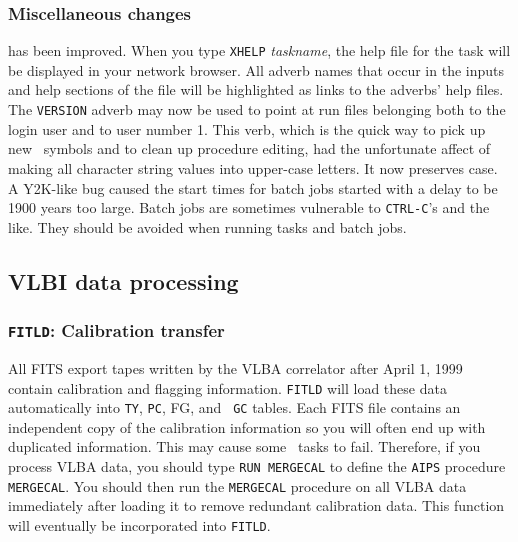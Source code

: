 \subsubsection{Miscellaneous changes}

\begin{description}
 has been improved.  When you type {\tt XHELP} {\it
    taskname}, the help file for the task will be displayed in your
    network browser.  All adverb names that occur in the inputs and
    help sections of the file will be highlighted as links to the
    adverbs' help files.
 The {\tt VERSION} adverb may now be used to point at run
    files belonging both to the login user and to user number 1.
 \hspace{3em} This verb, which is the quick way to
   pick up new \POPS\ symbols and to clean up procedure editing, had
   the unfortunate affect of making all character string values into
   upper-case letters.  It now preserves case.
 A Y2K-like bug caused the start times for batch jobs
    started with a delay to be 1900 years too large.  Batch jobs are
    sometimes vulnerable to {\tt CTRL-C}'s and the like.  They should
   be avoided when running tasks and batch jobs.
\end{description}

\subsection{VLBI data processing}

\subsubsection{{\tt FITLD}: Calibration transfer}

All FITS export tapes written by the VLBA correlator after April 1,
1999 contain calibration and flagging information.  {\tt FITLD} will
load these data automatically into {\tt TY}, {\tt PC}, FG, and {\tt
GC} tables.  Each FITS file contains an independent copy of the
calibration information so you will often end up with duplicated
information. This may cause some \AIPS\ tasks to fail.  Therefore,
if you process VLBA data, you should type {\tt RUN MERGECAL} to define
the {\tt AIPS} procedure {\tt MERGECAL}\@.  You should then run the
{\tt MERGECAL} procedure on all VLBA data immediately after loading it
to remove redundant calibration data.  This function will eventually be
incorporated into {\tt FITLD}\@.

